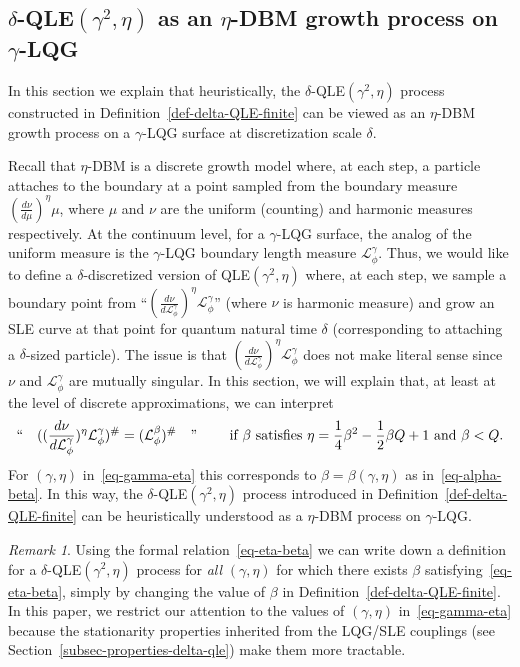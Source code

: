 \documentclass[a4paper]{article}
\numberwithin{equation}{section}
\newcommand{\eqb}{\begin{equation}}
\newcommand{\eqe}{\end{equation}}
\newcommand{\cL}{\mathcal{L}}
\theoremstyle{remark}
\newtheorem{remark}[theorem]{Remark}
\numberwithin{equation}{section}
\begin{document}
\subsection{$\delta$-QLE$(\gamma^2, \eta)$ as an $\eta$-DBM growth process on $\gamma$-LQG }\label{sec-scaling-rels} 
In this section we explain that heuristically, the $\delta$-QLE$(\gamma^2, \eta)$ process constructed in Definition~\ref{def-delta-QLE-finite} can be viewed as an $\eta$-DBM growth process on a $\gamma$-LQG surface at discretization scale $\delta$. 

Recall that $\eta$-DBM is a discrete growth model where, at each step, a particle attaches to the boundary at a point sampled from the boundary measure $(\frac{d\nu}{d\mu})^{\eta} \mu$, where $\mu$ and $\nu$ are the uniform (counting) and harmonic measures respectively. At the continuum level, for a $\gamma$-LQG surface, the analog of the uniform measure is the $\gamma$-LQG boundary length measure $\cL^\gamma_\phi$. Thus, we would like to define a $\delta$-discretized version of QLE$(\gamma^2, \eta)$ where, at each step, we sample a boundary point from ``$(\frac{d\nu}{d\cL^\gamma_\phi})^\eta \cL^\gamma_\phi$'' (where $\nu$ is harmonic measure) and grow an SLE curve at that point for quantum natural time $\delta$ (corresponding to attaching a $\delta$-sized particle). The issue is that $(\frac{d\nu}{d\cL^\gamma_\phi})^\eta \cL^\gamma_\phi$ does not make literal sense since $\nu$ and $\cL^\gamma_\phi$ are mutually singular. In this section, we will explain that, at least at the level of discrete approximations,
we can interpret 
\eqb\label{eq-eta-beta}
\text{``\quad $((\frac{d\nu}{d\cL^\gamma_\phi})^\eta \cL^\gamma_\phi)^\# = (\cL^\beta_\phi)^\#$\quad ''}\qquad \text{ if }\beta \text{ satisfies } 
 \eta =  \frac14 \beta^2 - \frac12 \beta Q + 1 \text{ and } \beta < Q.
\eqe
For $(\gamma, \eta)$ in~\eqref{eq-gamma-eta} this corresponds to $\beta = \beta(\gamma, \eta)$ as in~\eqref{eq-alpha-beta}. In this way, the $\delta$-QLE$(\gamma^2, \eta)$ process introduced in Definition~\ref{def-delta-QLE-finite} can be heuristically understood as a $\eta$-DBM process on $\gamma$-LQG. 

\begin{remark}
    Using the formal relation~\eqref{eq-eta-beta} we can write down a definition for a $\delta$-QLE$(\gamma^2, \eta)$ process for \emph{all} $(\gamma, \eta)$ for which there exists $\beta$ satisfying~\eqref{eq-eta-beta}, simply by changing the value of $\beta$ in Definition~\ref{def-delta-QLE-finite}. In this paper, we restrict our attention to the values of $(\gamma, \eta)$ in~\eqref{eq-gamma-eta} because the stationarity properties inherited from the LQG/SLE couplings (see Section~\ref{subsec-properties-delta-qle}) make them more tractable. 
\end{remark}
\end{document}
